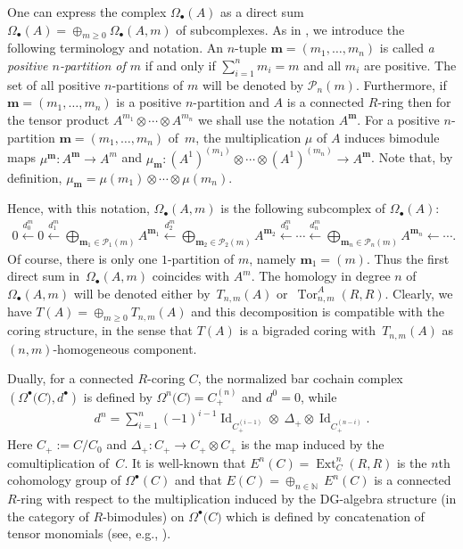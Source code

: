 \documentclass[pdftex]{sigma}
\def\b{\bullet}
\newcommand{\bs}[1]{\boldsymbol{#1}}
\DeclareMathOperator{\I}{Id}
\newcommand\ot{\otimes}
\newcommand{\Cp}[1]{C_+^{(#1)}}
\def\m{\mu}
\newcommand{\Ou}[2]{\Omega^{#1}\big(#2\big)}
\renewcommand{\^}[1]{\mbox{$^{\left( #1 \right)}$}}
\renewcommand{\_}[1]{\mbox{$_{\left( #1 \right)}$}}
\numberwithin{equation}{section}
\begin{document}
One can express the complex $\Omega_\bullet(A)$ as a direct sum $\Omega_\bullet(A)=\oplus_{m \geq 0} \Omega_\bullet(A,m)$ of subcomplexes. As in \cite[Section~1.6]{mst}, we introduce the following terminology and notation. An $n$-tuple $\boldsymbol{m}=(m_1,\dots,m_n)$ is called \textit{a positive $n$-partition of $m$} if and only if $\sum\limits_{i=1}^n m_i=m$ and all $m_i$ are positive. The set of all positive $n$-partitions of $m$ will be denoted by $\mathscr{P}_n(m)$. Furthermore, if $\boldsymbol{m}=(m_1,\dots,m_n)$ is a positive $n$-partition and $A$ is a connected $R$-ring then for the tensor product $A^{m_1}\ot\cdots\ot A^{m_n}$ we shall use the notation $A^{\boldsymbol{m}}$. For a positive $n$-partition $\bs{m}=(m_1,\dots,m_n)$ of~$m$, the multiplication $\m$ of $A$ induces bimodule maps $\mu^{\bs{m}}\colon A^{\bs{m}}\to A^m$ and $\mu_{\bs{m}}\colon (A^1)^{(m_1)}\ot\cdots \ot(A^1)^{(m_n)}\to A^{\bs{m}}$. Note that, by def\/inition, $\mu_{\bs{m}}=\m(m_1)\ot\cdots\ot\m(m_n)$.

Hence, with this notation, $\Omega_\bullet(A,m)$ is the following subcomplex of $\Omega_\bullet(A)$:
\begin{gather*}
0 \xleftarrow{d_0^m} 0 \xleftarrow{d_1^m} \bigoplus \limits_{\boldsymbol{m}_1\in\mathscr{P}_1(m)} A^{\boldsymbol{m}_1} \xleftarrow{d_2^m} \bigoplus \limits_{\boldsymbol{m}_2\in\mathscr{P}_2(m)} A^{\boldsymbol{m}_2}\xleftarrow{d_3^m} \cdots \xleftarrow{d^m_n}  \bigoplus \limits_{\boldsymbol{m}_n\in\mathscr{P}_{n}(m)} A^{\boldsymbol{m}_n}\xleftarrow{\ \ \ }\cdots .
\end{gather*}
Of course, there is only one $1$-partition of $m$, namely $\boldsymbol{m}_1=(m)$. Thus the f\/irst direct sum in~$\Omega_\bullet(A,m)$ coincides with $A^m$. The homology in degree $n$ of $\Omega_\bullet(A,m)$ will be denoted either by~$T_{n,m}(A)$ or~$\operatorname{Tor}_{n,m}^A(R,R)$. Clearly, we have $T(A)=\oplus_{m\geq 0} T_{n,m}(A)$ and this decomposition is compatible with the coring structure, in the sense that $T(A)$ is a bigraded coring with~$T_{n,m}(A)$ as $(n,m)$-homogeneous component.
	
Dually, for a connected $R$-coring $C$, the normalized bar cochain complex $(\Ou{\bullet}{C}, d^\b)$ is def\/ined by $\Ou{n}{C}=\Cp{n}$ and $d^0=0$, while
\begin{gather*}
d^n=\sum_{i=1}^{n}(-1)^{i-1}\I_{C_+^{(i-1)}}\ot\;\Delta_+\ot\I_{C_+^{(n-i)}}.
\end{gather*}
Here $C_+:=C/C_0$ and $\Delta_+\colon C_+\to C_+\ot C_+$ is the map induced by the comultiplication of~$C$. It is well-known that $E^n(C)=\operatorname{Ext}^n_C(R,R)$ is the $n$th cohomology group of $\Omega^\bullet(C)$ and that $E(C)=\oplus_{n \in \mathbb{N}} \ E^n(C)$ is a connected $R$-ring with respect to the multiplication induced by the DG-algebra structure (in the category of $R$-bimodules) on $\Ou{\b}{C}$ which is def\/ined by concatenation of tensor monomials (see, e.g., \cite[Section~1.1]{PP}).
\end{document}
